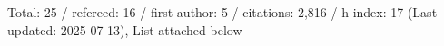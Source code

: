 Total: 25 / refereed: 16 / first author: 5 / citations: 2,816 / h-index: 17 (Last updated: 2025-07-13), List attached below